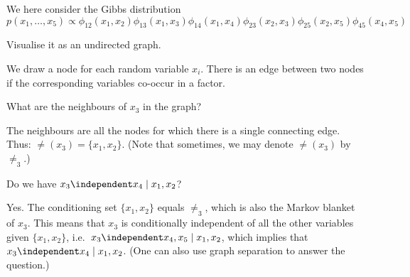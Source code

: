 
\label{ex:visualising-gibbs-distributions}
We here consider the Gibbs distribution
$$p(x_1, \ldots, x_5) \propto \phi_{12}(x_1,x_2)\phi_{13}(x_1,x_3)\phi_{14}(x_1,x_4)\phi_{23}(x_2,x_3)\phi_{25}(x_2,x_5)\phi_{45}(x_4,x_5)$$

\begin{exenumerate}
\item Visualise it as an undirected graph.

  \begin{solution}

   We draw a node for each random variable $x_i$. There is an edge between two nodes if the corresponding variables co-occur in a factor. 
\begin{center}
\end{center}

  \end{solution}

\item What are the neighbours of $x_3$ in the graph?

  \begin{solution}
    The neighbours are all the nodes for which there is a single connecting edge. Thus:   
    $\ne(x_3) = \{x_1, x_2\}$. (Note that sometimes, we may denote $\ne(x_3)$ by $\ne_3$.)
  \end{solution}

\item Do we have $x_3 \independent x_4 \mid x_1, x_2$?

  \begin{solution}
    Yes. The conditioning set $\{x_1,x_2\}$ equals $\ne_3$, which is also the Markov blanket of  $x_3$. This means that $x_3$ is conditionally independent of all the other variables given $\{x_1,x_2\}$, i.e.\ $x_3 \independent x_4,x_5 \mid x_1, x_2$, which implies that $x_3 \independent x_4 \mid x_1, x_2$. (One can also use graph separation to answer the question.)
  \end{solution}
  

\end{exenumerate}
